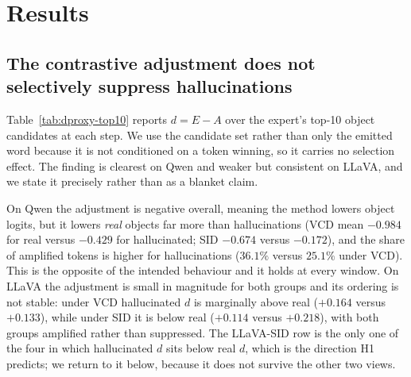 
\section{Results}
\label{sec:dproxy-results}

\subsection{The contrastive adjustment does not selectively suppress hallucinations}
\label{subsec:dproxy-res-d}

Table~\ref{tab:dproxy-top10} reports $d = E - A$ over the expert's top-10 object
candidates at each step. We use the candidate set rather than only the emitted
word because it is not conditioned on a token winning, so it carries no selection
effect. The finding is clearest on Qwen and weaker but consistent on LLaVA, and
we state it precisely rather than as a blanket claim.

On Qwen the adjustment is negative overall, meaning the method lowers object
logits, but it lowers \emph{real} objects far more than hallucinations (VCD mean
$-0.984$ for real versus $-0.429$ for hallucinated; SID $-0.674$ versus
$-0.172$), and the share of amplified tokens is higher for hallucinations
($36.1\%$ versus $25.1\%$ under VCD). This is the opposite of the intended
behaviour and it holds at every window. On LLaVA the adjustment is small in
magnitude for both groups and its ordering is not stable: under VCD hallucinated
$d$ is marginally above real ($+0.164$ versus $+0.133$), while under SID it is
below real ($+0.114$ versus $+0.218$), with both groups amplified rather than
suppressed. The LLaVA-SID row is the only one of the four in which hallucinated
$d$ sits below real $d$, which is the direction H1 predicts; we return to it
below, because it does not survive the other two views.

